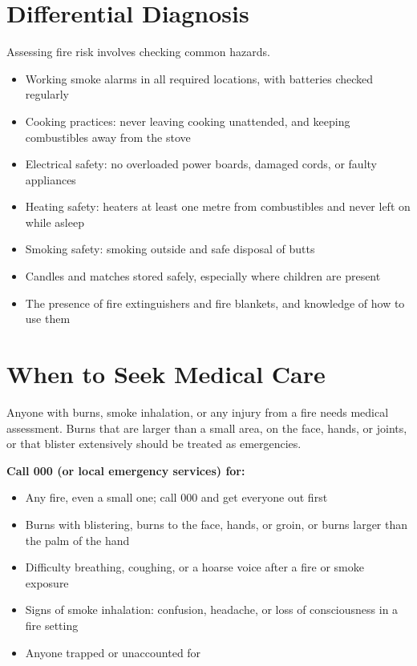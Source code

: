\section*{Differential Diagnosis}
Assessing fire risk involves checking common hazards.
\begin{itemize}
    \item Working smoke alarms in all required locations, with batteries checked regularly
    \item Cooking practices: never leaving cooking unattended, and keeping combustibles away from the stove
    \item Electrical safety: no overloaded power boards, damaged cords, or faulty appliances
    \item Heating safety: heaters at least one metre from combustibles and never left on while asleep
    \item Smoking safety: smoking outside and safe disposal of butts
    \item Candles and matches stored safely, especially where children are present
    \item The presence of fire extinguishers and fire blankets, and knowledge of how to use them
\end{itemize}

\section*{When to Seek Medical Care}
Anyone with burns, smoke inhalation, or any injury from a fire needs medical assessment. Burns that are larger than a small area, on the face, hands, or joints, or that blister extensively should be treated as emergencies.

\textbf{Call 000 (or local emergency services) for:}
\begin{itemize}
    \item Any fire, even a small one; call 000 and get everyone out first
    \item Burns with blistering, burns to the face, hands, or groin, or burns larger than the palm of the hand
    \item Difficulty breathing, coughing, or a hoarse voice after a fire or smoke exposure
    \item Signs of smoke inhalation: confusion, headache, or loss of consciousness in a fire setting
    \item Anyone trapped or unaccounted for
\end{itemize}


